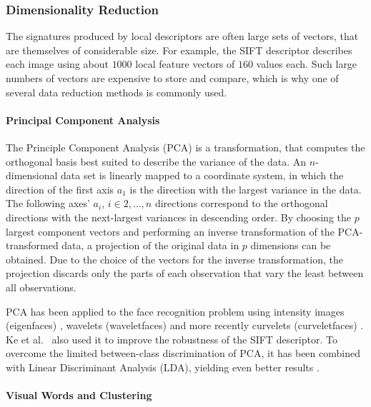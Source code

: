 \subsubsection{Dimensionality Reduction}

The signatures produced by local descriptors are often large sets of vectors,
that are themselves of considerable size. For example, the SIFT descriptor
describes each image using about $1000$ local feature vectors of $160$ values
each. Such large numbers of vectors are expensive to store and compare, which
is why one of several data reduction methods is commonly used.

\paragraph{Principal Component Analysis}

The Principle Component Analysis (PCA) is a transformation, that computes the
orthogonal basis best suited to describe the variance of the data. An
$n$-dimensional data set is linearly mapped to a coordinate system, in which
the direction of the first axis $a_1$ is the direction with the largest
variance in the data. The following axes' $a_i$, $i \in 2, \dots, n$ directions
correspond to the orthogonal directions with the next-largest variances in
descending order. By choosing the $p$ largest component vectors and performing
an inverse transformation of the PCA-transformed data, a projection of the
original data in $p$ dimensions can be obtained. Due to the choice of the
vectors for the inverse transformation, the projection discards only the parts
of each observation that vary the least between all observations.

PCA has been applied to the face recognition problem using intensity images
(eigenfaces) \autocite{turk_face_1991}, wavelets (waveletfaces)
\autocite{feng_human_2000} and more recently curvelets (curveletfaces)
\autocite{mandal_face_2008}. Ke et al.\ \autocite{ke_pca-sift:_2004} also used
it to improve the robustness of the SIFT \autocite{lowe_object_1999}
descriptor. To overcome the limited between-class discrimination of PCA, it has
been combined with Linear Discriminant Analysis (LDA), yielding even better
results \autocite{mandal_curvelet_2009}.

\paragraph{Visual Words and Clustering}\label{sec:anatomy_clustering}

